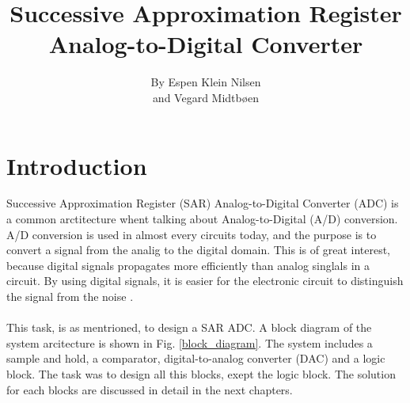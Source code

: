 \documentclass[english, 12pt, a4paper]{article}
\title{ \huge{Successive Approximation Register Analog-to-Digital Converter}}
\author{By Espen Klein Nilsen\\ and Vegard Midtbøen}
\begin{document}
\ififorside{}
\maketitle{} \newpage

\tableofcontents{} \newpage
\listoffigures{} 
\listoftables{} \newpage



\section{Introduction} 
Successive Approximation Register (SAR) Analog-to-Digital Converter (ADC) is a common arctitecture whent talking about Analog-to-Digital (A/D) conversion. A/D conversion is used in almost every
circuits today, and the purpose is to convert a signal from the analig to the digital domain. This is of great interest, because digital signals propagates more efficiently than analog singlals in a 
circuit. By using digital signals, it is easier for the electronic circuit to distinguish the signal from the noise \cite{basic-adc}.\\
\\
This task, is as mentrioned, to design a SAR ADC. A block diagram of the system arcitecture is shown in Fig. \ref{block_diagram}. The system includes a sample and hold, a comparator, digital-to-analog 
converter (DAC) and a logic block. The task was to design all this blocks, exept the logic block. The solution for each blocks are discussed in detail in the next chapters.  
\end{document}
